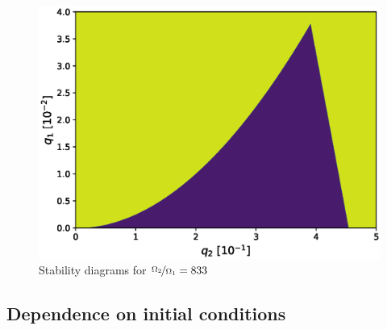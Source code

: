
\begin{figure}[H]
	\centering
	\includegraphics[width=\linewidth]{img/0_ions_1_electrons_q1_0.0-0.04_q2_0.0-0.5_897x897_833.eps}
	\caption{Stability diagrams for $\nicefrac{\Omega_2}{\Omega_1} = 833$}
	\label{fig:stabil-eta=833}
\end{figure}

\subsection{Dependence on initial conditions}

